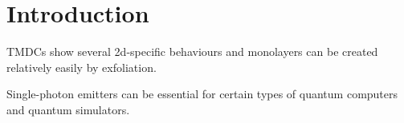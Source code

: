 \section{Introduction}

TMDCs show several 2d-specific behaviours and monolayers can be created relatively easily by exfoliation.

Single-photon emitters can be essential for certain types of quantum computers and quantum simulators.
